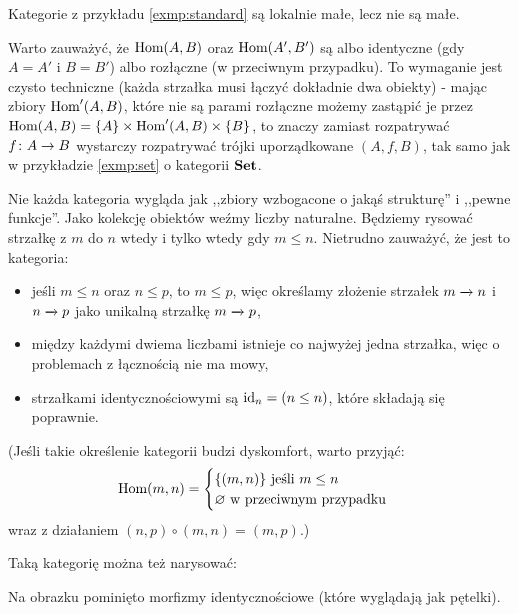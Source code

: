 \begin{exmp}
  Kategorie z przykładu \ref{exmp:standard} są lokalnie małe, lecz nie są małe.
\end{exmp}

\begin{remk}
  \label{remk:rozlaczne}
  Warto zauważyć, że $\textrm{Hom}(A, B)$ oraz $\textrm{Hom}(A', B')$ są albo identyczne (gdy $A=A'$ i $B=B'$) albo rozłączne (w przeciwnym przypadku).
  To wymaganie jest czysto techniczne (każda strzałka musi łączyć dokładnie dwa obiekty) - mając zbiory $\textrm{Hom}'(A, B)$, które nie są parami rozłączne możemy zastąpić je przez $\textrm{Hom}(A, B) =\{A\}\times \textrm{Hom}'(A, B) \times \{B\}$, to znaczy zamiast rozpatrywać $f\colon A\to B$ wystarczy rozpatrywać trójki uporządkowane $(A, f, B)$, tak samo jak w przykładzie \ref{exmp:set} o kategorii $\textbf{Set}$.
\end{remk}

\begin{exmp}
  \label{exmp:natur}
  {\newcommand{\naturalnum}{\mathbb N}
  Nie każda kategoria wygląda jak ,,zbiory wzbogacone o jakąś strukturę'' i ,,pewne funkcje''. Jako kolekcję obiektów weźmy liczby naturalne. Będziemy rysować strzałkę z $m$ do $n$ wtedy i tylko wtedy gdy $m\le n$. Nietrudno zauważyć, że jest to kategoria:
  \begin{itemize}
    \item jeśli $m\le n$ oraz $n\le p$, to $m\le p$, więc określamy złożenie strzałek $m \xrightarrow{} n$ i $n \xrightarrow{} p$ jako unikalną strzałkę $m \xrightarrow{} p$,
    \item między każdymi dwiema liczbami istnieje co najwyżej jedna strzałka, więc o problemach z łącznością nie ma mowy,
    \item strzałkami identycznościowymi są $\mathrm{id}_{n} = (n\le n)$, które składają się poprawnie.
  \end{itemize}
  (Jeśli takie określenie kategorii budzi dyskomfort, warto przyjąć:
  $$
  \textrm{Hom}(m, n) =
  \begin{cases}
    \{ (m, n) \} \text{ jeśli $m\le n$}\\
    \varnothing \text{ w przeciwnym przypadku}
  \end{cases}
  $$
  wraz z działaniem $(n, p)\circ (m, n) = (m, p)$.)
  }
  Taką kategorię można też narysować:
  \begin{center}
  \end{center}
  Na obrazku pominięto morfizmy identycznościowe (które wyglądają jak pętelki).
\end{exmp}

